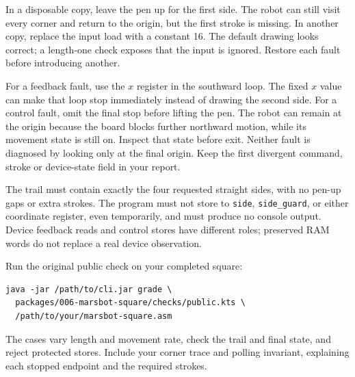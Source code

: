 In a disposable copy, leave the pen up for the first side. The robot can still
visit every corner and return to the origin, but the first stroke is missing.
In another copy, replace the input load with a constant 16. The default drawing
looks correct; a length-one check exposes that the input is ignored. Restore each
fault before introducing another.

For a feedback fault, use the $x$ register in the southward loop. The fixed $x$
value can make that loop stop immediately instead of drawing the second side.
For a control fault, omit the final stop before lifting the pen. The robot can
remain at the origin because the board blocks further northward motion, while
its movement state is still on. Inspect that state before exit. Neither fault is
diagnosed by looking only at the final origin. Keep the first divergent command,
stroke or device-state field in your report.

The trail must contain exactly the four requested straight sides, with no pen-up
gaps or extra strokes. The program must not store to \texttt{side},
\texttt{side\_guard}, or either coordinate register, even temporarily, and must
produce no console output. Device feedback reads and control stores have different
roles; preserved RAM words do not replace a real device observation.

\begin{samepage}
  Run the original public check on your completed square:
  \begin{verbatim}
java -jar /path/to/cli.jar grade \
  packages/006-marsbot-square/checks/public.kts \
  /path/to/your/marsbot-square.asm
\end{verbatim}
  \par\end{samepage}

The cases vary length and movement rate, check the trail and final state, and
reject protected stores. Include your corner trace and polling invariant,
explaining each stopped endpoint and the required strokes.
